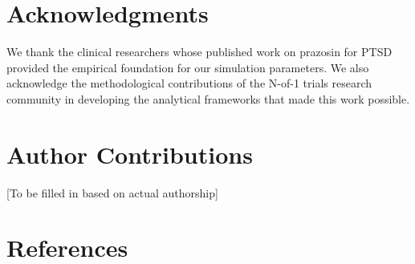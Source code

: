 \documentclass[
  11pt,
]{article}
\begin{document}
\section{Acknowledgments}\label{acknowledgments}

We thank the clinical researchers whose published work on prazosin for
PTSD provided the empirical foundation for our simulation parameters. We
also acknowledge the methodological contributions of the N-of-1 trials
research community in developing the analytical frameworks that made
this work possible.

\section{Author Contributions}\label{author-contributions}

{[}To be filled in based on actual authorship{]}

\section{References}\label{references}
\end{document}
